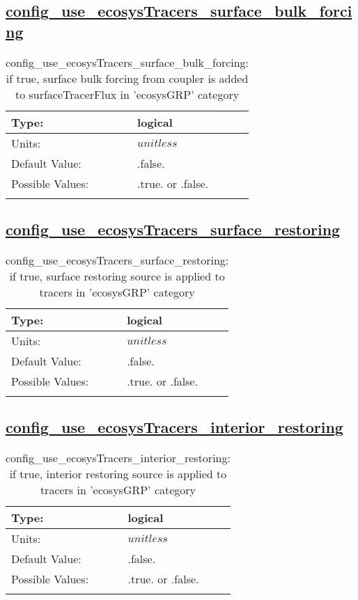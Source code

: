 \subsection[config\_use\_ecosysTracers\_surface\_bulk\_forcing]{\hyperref[sec:nm_tab_tracer_forcing_ecosysTracers]{config\_use\_ecosysTracers\_surface\_bulk\_forcing}}
\label{subsec:nm_sec_config_use_ecosysTracers_surface_bulk_forcing}
\begin{center}
\begin{longtable}{| p{2.0in} || p{4.0in} |}
    \hline
    Type: & logical \\
    \hline
    Units: & $unitless$ \\
    \hline
    Default Value: & .false. \\
    \hline
    Possible Values: & .true. or .false. \\
    \hline
    \caption{config\_use\_ecosysTracers\_surface\_bulk\_forcing: if true, surface bulk forcing from coupler is added to surfaceTracerFlux in 'ecosysGRP' category}
\end{longtable}
\end{center}
\subsection[config\_use\_ecosysTracers\_surface\_restoring]{\hyperref[sec:nm_tab_tracer_forcing_ecosysTracers]{config\_use\_ecosysTracers\_surface\_restoring}}
\label{subsec:nm_sec_config_use_ecosysTracers_surface_restoring}
\begin{center}
\begin{longtable}{| p{2.0in} || p{4.0in} |}
    \hline
    Type: & logical \\
    \hline
    Units: & $unitless$ \\
    \hline
    Default Value: & .false. \\
    \hline
    Possible Values: & .true. or .false. \\
    \hline
    \caption{config\_use\_ecosysTracers\_surface\_restoring: if true, surface restoring source is applied to tracers in 'ecosysGRP' category}
\end{longtable}
\end{center}
\subsection[config\_use\_ecosysTracers\_interior\_restoring]{\hyperref[sec:nm_tab_tracer_forcing_ecosysTracers]{config\_use\_ecosysTracers\_interior\_restoring}}
\label{subsec:nm_sec_config_use_ecosysTracers_interior_restoring}
\begin{center}
\begin{longtable}{| p{2.0in} || p{4.0in} |}
    \hline
    Type: & logical \\
    \hline
    Units: & $unitless$ \\
    \hline
    Default Value: & .false. \\
    \hline
    Possible Values: & .true. or .false. \\
    \hline
    \caption{config\_use\_ecosysTracers\_interior\_restoring: if true, interior restoring source is applied to tracers in 'ecosysGRP' category}
\end{longtable}
\end{center}
